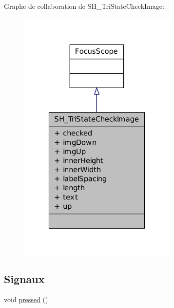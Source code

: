 Graphe de collaboration de S\-H\-\_\-\-Tri\-State\-Check\-Image\-:\nopagebreak
\begin{figure}[H]
\begin{center}
\leavevmode
\includegraphics[width=226pt]{classSH__TriStateCheckImage__coll__graph}
\end{center}
\end{figure}
\subsection*{Signaux}
\begin{DoxyCompactItemize}
\item 
void \hyperlink{classSH__TriStateCheckImage_aad96452a92df7b35ed1cec9eebf6d2ba}{pressed} ()
\end{DoxyCompactItemize}
